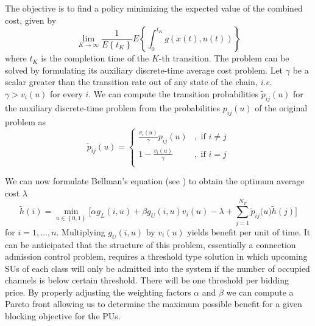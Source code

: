 The objective is to find a policy minimizing the expected value of the combined cost, given by
\begin{equation}	 \lim_{K\rightarrow\infty}\frac{1}{E\left\{t_{K}\right\}}
E\left\{\int^{t_{K}}_{0}g\left(x(t),u(t)\right)\right\}
\end{equation}
where $t_{K}$ is the completion time of the $K$-th transition. The problem can be solved by formulating its auxiliary discrete-time average cost problem. Let $\gamma$ be a scalar greater than the transition rate out of any state of the chain, \textit{i.e.} $\gamma > v_{i}(u)$ for every $i$.
We can compute the transition probabilities $\tilde{p}_{ij}(u)$ for the auxiliary discrete-time problem from the probabilities $p_{ij}(u)$ of the original problem as
\begin{equation}
	  \tilde{p}_{ij}(u) =
	  \begin{cases}
		\frac{v_{i}(u)}{\gamma}p_{ij}(u) &, \text{ if }i \neq j\\	
		1- \frac{v_{i}(u)}{\gamma}&, \text{ if }i = j \\
 \end{cases}
\end{equation}

We can now formulate Bellman's equation (see \cite{ref:Bertsekas}) to obtain the optimum average cost $\lambda$
\begin{equation}\label{BellmanEqAuction}
\tilde{h}\left(i\right) = \min_{u\in \left\{0,1\right\}}\biggl[\alpha g_{L}(i,u) + \beta g_{U}(i,u)v_{i}(u) -
 \lambda + \displaystyle\sum_{j=1}^{N_{T}}\tilde{p}_{ij}\bigl(u\bigr)\tilde{h}\left(j\right)\biggr]
\end{equation}
for $i =1,\ldots,n$. Multiplying $g_{U}(i,u)$ by $v_{i}(u)$ yields benefit per unit of time.
It can be anticipated that the structure of this problem, essentially a connection admission control problem, requires a threshold type solution in which upcoming SUs of each class will only be admitted into the system if the number of occupied channels is below certain threshold. There will be one threshold per bidding price. By properly adjusting the weighting factors $\alpha$ and $\beta$ we can compute a Pareto front allowing us to determine the maximum possible benefit for a given blocking objective for the PUs.
 

